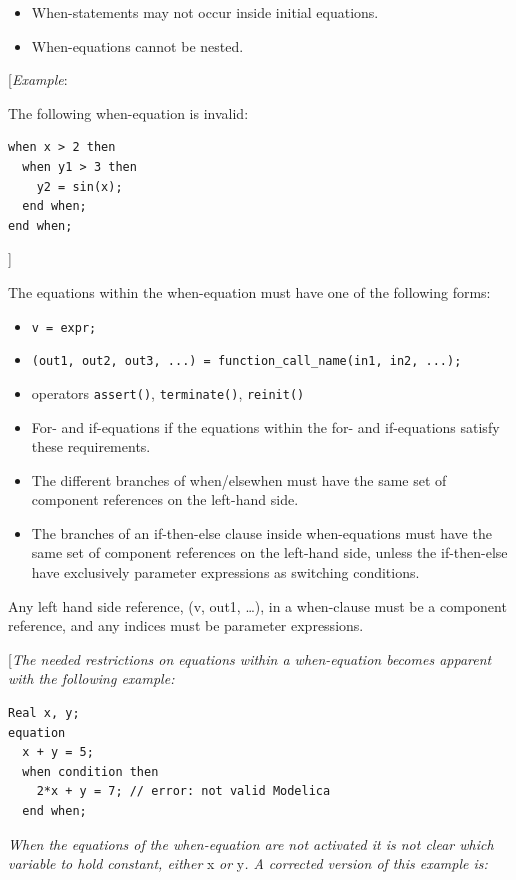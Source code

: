 \documentclass[10pt,a4paper]{report}
\begin{document}
\begin{itemize}
\item
  When-statements may not occur inside initial equations.
\item
  When-equations cannot be nested.
\end{itemize}

{[}\emph{Example}:

The following when-equation is invalid:
\begin{lstlisting}[language=modelica]
when x > 2 then
  when y1 > 3 then
    y2 = sin(x);
  end when;
end when; 
\end{lstlisting}

{]}

The equations within the when-equation must have one of the following
forms:

\begin{itemize}
\item \lstinline!v = expr;!
\item \lstinline!(out1, out2, out3, ...) = function_call_name(in1, in2, ...);!
\item
  operators \lstinline!assert()!, \lstinline!terminate()!, \lstinline!reinit()!
\item
  For- and if-equations if the equations within the for- and
  if-equations satisfy these requirements.
\item
  The different branches of when/elsewhen must have the same set of
  component references on the left-hand side.
\item
  The branches of an if-then-else clause inside when-equations must have
  the same set of component references on the left-hand side, unless the
  if-then-else have exclusively parameter expressions as switching
  conditions.
\end{itemize}

Any left hand side reference, (v, out1, \ldots{}), in a when-clause must
be a component reference, and any indices must be parameter expressions.

{[}\emph{The needed restrictions on equations within a when-equation
becomes apparent with the following example: }

\begin{lstlisting}[language=modelica]
  Real x, y;
equation
  x + y = 5;
  when condition then
    2*x + y = 7; // error: not valid Modelica
  end when;
\end{lstlisting}

\emph{When the equations of the when-equation are not activated it is
not clear which variable to hold constant, either} x \emph{or} y\emph{.
A corrected version of this example is: }
\end{document}
